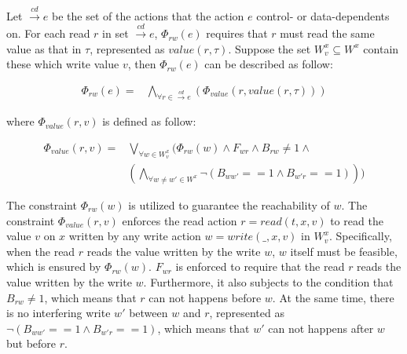 \documentclass[preprint, numbers, 10pt]{sigplanconf}
\begin{document}
Let $\stackrel{cd}{\longrightarrow} e$ be the set of the actions that 
the action $e$ control- or data-dependents on. 
For each read $r$ in set  $\stackrel{cd}{\longrightarrow} e$, $\Phi_{rw}(e)$
requires that $r$ must read the same value as that in $\tau$, represented as $value(r, \tau)$. 
Suppose %
the set $W_v^x\subseteq W^x$ contain these which write value $v$, then
$\Phi_{rw}(e)$ can be described as follow: 

\begin{equation}
\begin{aligned}
\Phi_{rw}(e) ={} & \bigwedge_{\forall r\in \stackrel{cd}{\longrightarrow} e} 
					(\Phi_{value}(r,value(r,\tau)))
\end{aligned}
\end{equation} 

where $\Phi_{value}(r,v)$ is defined as follow: 

\begin{equation}
\begin{aligned}
\Phi_{value}(r,v) ={} & \bigvee_{\forall w\in W_v^x} (\Phi_{rw}(w)\wedge F_{wr}\wedge 
					  B_{rw}\neq 1\wedge \\
					& (\bigwedge_{\forall w\neq w'\in W^x}\neg (B_{ww'}==1\wedge B_{w'r}==1)))
\end{aligned}
\end{equation}

The constraint $\Phi_{rw}(w)$ is utilized to guarantee the reachability of $w$. 
The constraint $\Phi_{value}(r,v)$ enforces the read action $r=read(t ,x,v)$ 
to read the value $v$ on $x$ written by any write action $w =write(\_,x,v)$ in $W^x_v$.
Specifically, when the read $r$ reads the value written by the write $w$,
$w$ itself must be feasible, which is ensured by $\Phi_{rw}(w)$. 
$F_{wr}$ is enforced to require that the read $r$ reads the value written by the write $w$. 
Furthermore, it also subjects to the condition that $B_{rw}\neq 1$, which means that $r$ can
not happens before $w$. %
At the same time, there is no interfering write $w'$ between $w$ and $r$, represented as 
$\neg (B_{ww'}==1\wedge B_{w'r}==1)$, which means that 
$w'$ can not happens after $w$ but before $r$.
\end{document}
